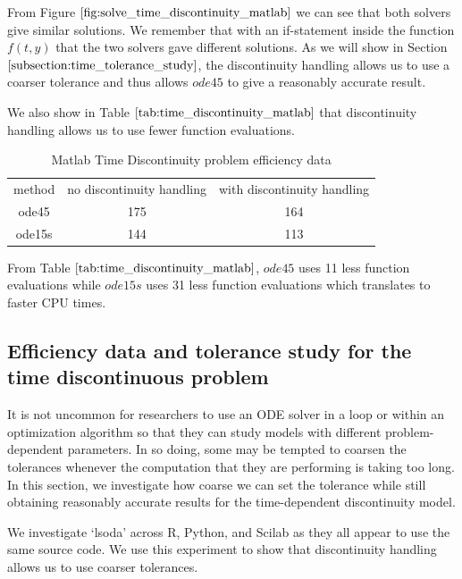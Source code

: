 From Figure $\ref{fig:solve_time_discontinuity_matlab}$ we can see that both solvers give similar solutions. We remember that with an if-statement inside the function $f(t, y)$ that the two solvers gave different solutions. As we will show in Section $\ref{subsection:time_tolerance_study}$, the discontinuity handling allows us to use a coarser tolerance and thus allows $ode45$ to give a reasonably accurate result.

We also show in Table $\ref{tab:time_discontinuity_matlab}$ that discontinuity handling allows us to use fewer function evaluations.

\begin{table}[h]
\caption {Matlab Time Discontinuity problem efficiency data} 
\label{tab:time_discontinuity_matlab} 
\begin{center}
\begin{tabular}{ c c c }
method & no discontinuity handling & with discontinuity handling \\ 
ode45 & 175 & 164 \\
ode15s & 144 & 113 \\
\end{tabular}
\end{center}
\end{table}

From Table $\ref{tab:time_discontinuity_matlab}$, $ode45$ uses 11 less function evaluations while $ode15s$ uses 31 less function evaluations which translates to faster CPU times.

\subsection{Efficiency data and tolerance study for the time discontinuous problem}
\label{subsection:time_tolerance_study}
It is not uncommon for researchers to use an ODE solver in a loop or within an optimization algorithm so that they can study models with different problem-dependent parameters. In so doing, some may be tempted to coarsen the tolerances whenever the computation that they are performing is taking too long. In this section, we investigate how coarse we can set the tolerance while still obtaining reasonably accurate results for the time-dependent discontinuity model. 

We investigate `lsoda' across R, Python, and Scilab as they all appear to use the same source code. We use this experiment to show that discontinuity handling allows us to use coarser tolerances.

